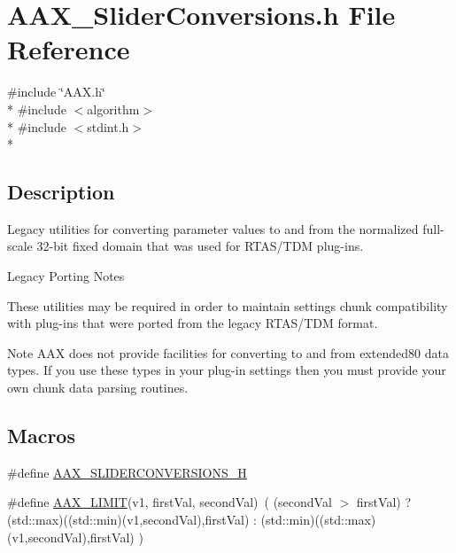 \hypertarget{a00295}{}\section{A\+A\+X\+\_\+\+Slider\+Conversions.\+h File Reference}
\label{a00295}
{\ttfamily \#include \char`\"{}A\+A\+X.\+h\char`\"{}}\\*
{\ttfamily \#include $<$algorithm$>$}\\*
{\ttfamily \#include $<$stdint.\+h$>$}\\*


\subsection{Description}
Legacy utilities for converting parameter values to and from the normalized full-\/scale 32-\/bit fixed domain that was used for R\+T\+A\+S/\+T\+D\+M plug-\/ins. 

\begin{DoxyRefDesc}{Legacy Porting Notes}
\item[\hyperlink{a00384__porting_notes000060}{Legacy Porting Notes}]These utilities may be required in order to maintain settings chunk compatibility with plug-\/ins that were ported from the legacy R\+T\+A\+S/\+T\+D\+M format.\end{DoxyRefDesc}


\begin{DoxyNote}{Note}
A\+A\+X does not provide facilities for converting to and from extended80 data types. If you use these types in your plug-\/in settings then you must provide your own chunk data parsing routines. 
\end{DoxyNote}
\subsection*{Macros}
\begin{DoxyCompactItemize}
\item 
\#define \hyperlink{a00295_a8676d067980b7fb9a1f53cfa5dbc048a}{A\+A\+X\+\_\+\+S\+L\+I\+D\+E\+R\+C\+O\+N\+V\+E\+R\+S\+I\+O\+N\+S\+\_\+\+H}
\item 
\#define \hyperlink{a00295_af5bd671969b131ba73e1651befa4f51f}{A\+A\+X\+\_\+\+L\+I\+M\+I\+T}(v1,  first\+Val,  second\+Val)~( (second\+Val $>$ first\+Val) ? (std\+::max)((std\+::min)(v1,second\+Val),first\+Val) \+:  (std\+::min)((std\+::max)(v1,second\+Val),first\+Val) )
\end{DoxyCompactItemize}
